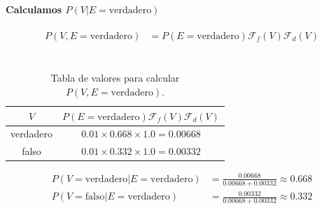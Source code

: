 \documentclass[12pt]{article}
\begin{document}
\paragraph{Calculamos $P(V|E=\text{verdadero})$}
\begin{equation}
\begin{split}
P(V,E=\text{verdadero})&=P(E=\text{verdadero})\mathcal{F}_f(V)\mathcal{F}_d(V)\\
\end{split}
\end{equation}\\
\begin{table}[h!]
	\centering
	\begin{tabular}{|c|c|}
		\hline
		\rowcolor[gray]{.8}
		$V$&$P(E=\text{verdadero})\mathcal{F}_f(V)\mathcal{F}_d(V)$ \\\hline %
		verdadero & $0.01\times0.668\times1.0=0.00668$\\\hline
		falso & $0.01\times0.332\times1.0=0.00332$\\\hline
	\end{tabular}
	\caption{Tabla de valores para calcular $P(V,E=\text{verdadero})$.}
	\label{tab:ej3013}
\end{table}
\begin{equation}
\begin{split}
P(V=\text{verdadero}|E=\text{verdadero})&=\frac{0.00668}{0.00668+0.00332}\approx 0.668\\
P(V=\text{falso}|E=\text{verdadero})&=\frac{0.00332}{0.00668+0.00332}\approx 0.332\\
\end{split}
\end{equation}
\end{document}
